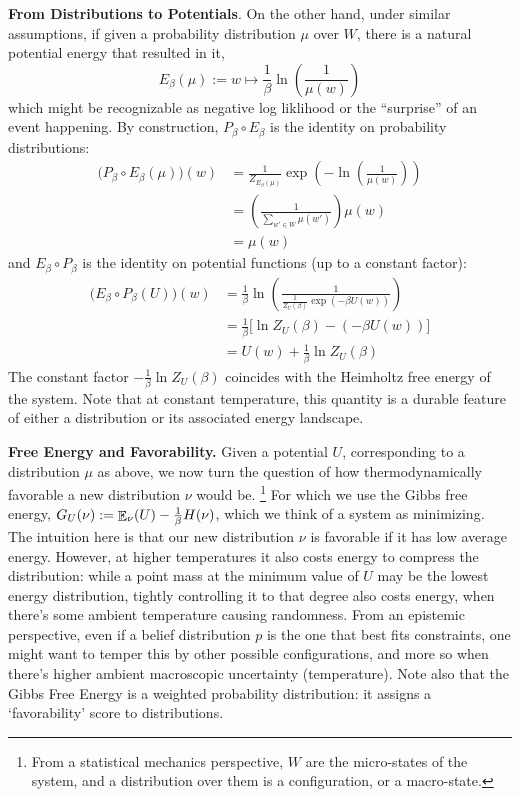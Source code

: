\documentclass{article}
\begin{document}
	\textbf{From Distributions to Potentials}.	
	On the other hand, under similar assumptions, if given a probability distribution $\mu$ over $W$, there is a natural potential energy that resulted in it, 
	\[ E_{\beta}(\mu) := w \mapsto \frac{1}{\beta} \ln \left(\frac{1}{\mu(w)}\right)  \]
	which might be recognizable as negative log liklihood or the ``surprise'' of an event happening. By construction, $P_\beta \circ E_\beta$ is the identity on probability distributions:
	\begin{align*}
		 \Big(P_\beta \circ E_\beta(\mu)\Big) (w) &= \frac{1}{Z_{ E_\beta (\mu) }} \exp \left( - \ln \left(\frac{1}{\mu(w)}\right) \right) \\
		 &= \left(\frac{1}{\sum\limits_{w' \in W} \mu(w')}\right)\mu(w) \\
		 &= \mu(w)
	\end{align*}
	and $E_\beta \circ P_\beta$ is the identity on potential functions (up to a constant factor):
	\begin{align*}
		\Big(E_{\beta}\circ P_\beta(U)\Big)(w) &= \frac{1}{\beta} \ln \left(\frac{1}{\frac{1}{Z_U(\beta)}\exp(-\beta U(w))}\right) \\
		&=  \frac{1}{\beta} \Big[\ln Z_U(\beta) - (-\beta U(w)) \Big]\\
		&= U(w) + \frac{1}{\beta} \ln Z_U (\beta)
	\end{align*}
	The constant factor $-\frac{1}{\beta} \ln Z_U(\beta)$ coincides with the Heimholtz free energy of the system. Note that at constant temperature, this quantity is a durable feature of either a distribution or its associated energy landscape. 
%	

	\textbf{Free Energy and Favorability.} Given a potential $U$, corresponding to a distribution $\mu$ as above, we now turn the question of how thermodynamically favorable a new distribution $\nu$ would be.%
		\footnote{From a statistical mechanics perspective, $W$ are the micro-states of the system, and a distribution over them is a configuration, or a macro-state.}
	For which we use the Gibbs free energy, $G_U(\nu) := {\mathop{\mathbb E}}_\nu( U ) - \frac{1}{\beta} H(\nu)$, which we think of a system as minimizing. The intuition here is that our new distribution $\nu$ is favorable if it has low average energy. However, at higher temperatures it also costs energy to compress the distribution: while a point mass at the minimum value of $U$ may be the lowest energy distribution, tightly controlling it to that degree also costs energy, when there's some ambient temperature causing randomness. From an epistemic perspective, even if a belief distribution $p$  is the one that best fits constraints, one might want to temper this by other possible configurations, and more so when there's higher ambient macroscopic uncertainty (temperature). Note also that the Gibbs Free Energy is a weighted probability distribution: it assigns a `favorability' score to distributions.
	
\end{document}
